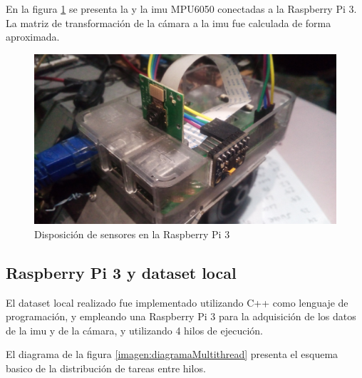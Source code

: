En la figura \ref{imagen:Raspbery} se presenta la   y la imu MPU6050 conectadas a la Raspberry Pi 3.  La matriz de transformación de la cámara a la imu fue calculada de forma aproximada.



\begin{figure}[H]
	\centering		\includegraphics[width=0.7\linewidth]{imagenes/prototipo/Raspberry}
	\caption{Disposición de sensores en la Raspberry Pi 3}
	\label{imagen:Raspbery}
\end{figure}


\subsection{Raspberry Pi 3 y dataset local}

El dataset local realizado fue implementado utilizando C++ como lenguaje de programación, y empleando una Raspberry Pi 3 para la adquisición de los datos de la imu y de la cámara, y utilizando 4 hilos de ejecución.

El diagrama de la figura \ref{imagen:diagramaMultithread} presenta el esquema basico de la distribución de tareas entre hilos.


